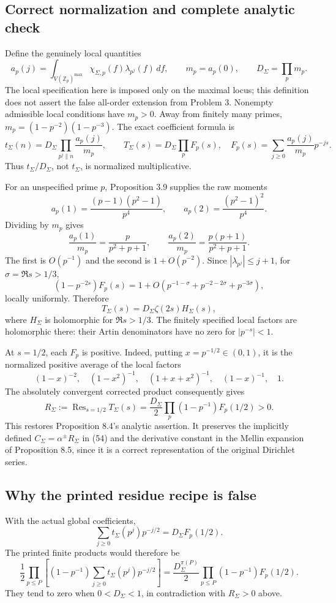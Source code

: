 \documentclass[10pt]{article}
\begin{document}
\subsection*{Correct normalization and complete analytic check}
Define the genuinely local quantities \[a_p(j)=\int_{V(\mathbb Z_p)^{\max}}
       \chi_{\Sigma,p}(f)\lambda_{p^j}(f)\,df,\qquad
 m_p=a_p(0),\qquad D_\Sigma=\prod_p m_p.\] The local specification here is imposed only on the maximal locus; this definition does not assert the false all-order extension from Problem 3. Nonempty admissible local conditions have \(m_p>0\). Away from finitely many primes, \(m_p=(1-p^{-2})(1-p^{-3})\). The exact coefficient formula is \[t_\Sigma(n)=D_\Sigma\prod_{p^j\parallel n}\frac{a_p(j)}{m_p},
 \qquad
 T_\Sigma(s)=D_\Sigma\prod_p F_p(s),
 \quad
 F_p(s)=\sum_{j\ge0}\frac{a_p(j)}{m_p}p^{-js}.\] Thus \(t_\Sigma/D_\Sigma\), not \(t_\Sigma\), is normalized multiplicative.\par
For an unspecified prime \(p\), Proposition 3.9 supplies the raw moments \[a_p(1)=\frac{(p-1)(p^2-1)}{p^4},\qquad
 a_p(2)=\frac{(p^2-1)^2}{p^4}.\] Dividing by \(m_p\) gives \[\frac{a_p(1)}{m_p}=\frac{p}{p^2+p+1},
 \qquad
 \frac{a_p(2)}{m_p}=\frac{p(p+1)}{p^2+p+1}.\] The first is \(O(p^{-1})\) and the second is \(1+O(p^{-2})\). Since \(|\lambda_{p^j}|\le j+1\), for \(\sigma=\Re s>1/3\), \[(1-p^{-2s})F_p(s)
 =1+O\!\left(p^{-1-\sigma}+p^{-2-2\sigma}+p^{-3\sigma}\right),\] locally uniformly. Therefore \[T_\Sigma(s)=D_\Sigma\zeta(2s)H_\Sigma(s),\] where \(H_\Sigma\) is holomorphic for \(\Re s>1/3\). The finitely specified local factors are holomorphic there: their Artin denominators have no zero for \(|p^{-s}|<1\).\par
At \(s=1/2\), each \(F_p\) is positive. Indeed, putting \(x=p^{-1/2}\in(0,1)\), it is the normalized positive average of the local factors \[(1-x)^{-2},\quad(1-x^2)^{-1},\quad
 (1+x+x^2)^{-1},\quad(1-x)^{-1},\quad1.\] The absolutely convergent corrected product consequently gives \[R_\Sigma:=\operatorname{Res}_{s=1/2}T_\Sigma(s)
 =\frac{D_\Sigma}{2}\prod_p(1-p^{-1})F_p(1/2)>0.\] This restores Proposition 8.4’s analytic assertion. It preserves the implicitly defined \(C_\Sigma=\alpha^\pm R_\Sigma\) in (54) and the derivative constant in the Mellin expansion of Proposition 8.5, since it is a correct representation of the original Dirichlet series.\par
\subsection*{Why the printed residue recipe is false}
With the actual global coefficients, \[\sum_{j\ge0}t_\Sigma(p^j)p^{-j/2}=D_\Sigma F_p(1/2).\] The printed finite products would therefore be \[\frac12\prod_{p\le P}\left[(1-p^{-1})
      \sum_{j\ge0}t_\Sigma(p^j)p^{-j/2}\right]
 =\frac{D_\Sigma^{\pi(P)}}2
      \prod_{p\le P}(1-p^{-1})F_p(1/2).\] They tend to zero when \(0<D_\Sigma<1\), in contradiction with \(R_\Sigma>0\) above.\par
\end{document}
